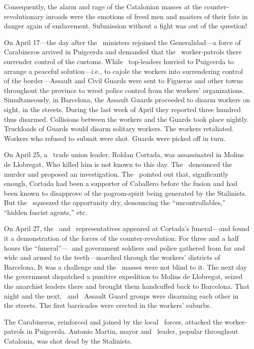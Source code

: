 Consequently, the alarm and rage of the Catalonian masses at the counter-revolutionary inroads were the emotions of freed men and masters of their fate in danger again of enslavement. Submission without a fight was out of the question!

On April 17---the day after the \CNT\ ministers rejoined the Ge\-ne\-ra\-li\-dad---a force of Carabineros arrived in Puigcerda and demanded that the \CNT\ worker-patrols there surrender control of the customs. While \CNT\ top-leaders hurried to Puigcerda to arrange a peaceful solution---i.e., to cajole the workers into surrendering control of the border---Assault and Civil Guards were sent to Figueras and other towns throughout the province to wrest police control from the workers’ organizations. Simultaneously, in Barcelona, the Assault Guards proceeded to disarm workers on sight, in the streets. During the last week of April they reported three hundred thus disarmed. Collisions between the workers and the Guards took place nightly. Truckloads of Guards would disarm solitary workers. The workers retaliated. Workers who refused to submit were shot. Guards were picked off in turn.

On April 25, a \PSUC\ trade union leader, Roldan Cortada, was assassinated in Molins de Llobregat. Who killed him is not known to this day. The \CNT\ denounced the murder and proposed an investigation. The \POUM\ pointed out that, significantly enough, Cortada had been a supporter of Caballero before the fusion and had been known to disapprove of the pogrom-spirit being generated by the Stalinists. But the \PSUC\ squeezed the opportunity dry, denouncing the ``uncontrollables,'' ``hidden fascist agents,'' etc.

On April 27, the \CNT\ and \POUM\ representatives appeared at Cortada’s funeral---and found it a demonstration of the forces of the counter-revolution. For three and a half hours the ``funeral''---\PSUC\ and government soldiers and police gathered from far and wide and armed to the teeth---marched through the workers’ districts of Barcelona. It was a challenge and the \CNT\ masses were not blind to it. The next day the government dispatched a punitive expedition to Molins de Llobregat, seized the anarchist leaders there and brought them handcuffed back to Barcelona. That night and the next, \CNT\ and \PSUC\ Assault Guard groups were disarming each other in the streets. The first barricades were erected in the workers’ suburbs.

The Carabineros, reinforced and joined by the local \PSUC\ forces, attacked the worker-patrols in Puigcerda. Antonio Martin, mayor and \CNT\ leader, popular throughout Catalonia, was shot dead by the Stalinists.

